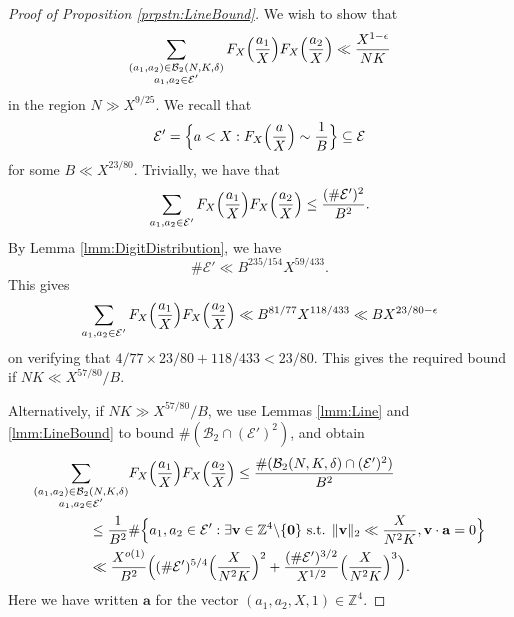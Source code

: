\documentclass[10pt]{amsart}
\theoremstyle{plain}
\numberwithin{sblmm}{thrm}
\numberwithin{equation}{section}
\begin{document}
\begin{proof}[Proof of Proposition \ref{prpstn:LineBound}] We wish to show that
\[
\sum_{\substack{ (a_1,a_2)\in\mathcal{B}_2(N,K,\delta) \\ a_1,a_2\in\mathcal{E}' }}F_X\Bigl(\frac{a_1}{X}\Bigr)F_X\Bigl(\frac{a_2}{X}\Bigr)\ll \frac{X^{1-\epsilon}}{N K}
\]
in the region $N\gg X^{9/25}$.
%
We recall that
\[
\mathcal{E}'=\Bigl\{a<X:F_X\Bigl(\frac{a}{X}\Bigr)\sim \frac{1}{B}\Bigr\}\subseteq\mathcal{E}
\]
for some $B\ll X^{23/80}$. Trivially, we have that
\[
\sum_{a_1,a_2\in\mathcal{E}'}F_X\Bigl(\frac{a_1}{X}\Bigr)F_X\Bigl(\frac{a_2}{X}\Bigr)\le \frac{(\#\mathcal{E}')^2}{B^2}.
\]
 By Lemma \ref{lmm:DigitDistribution}, we have
\begin{equation}
\#\mathcal{E}'\ll B^{235/154}X^{59/433}.\label{eq:BSetBound}
\end{equation}
 This gives 
 \[
\sum_{a_1,a_2\in\mathcal{E}'}F_X\Bigl(\frac{a_1}{X}\Bigr)F_X\Bigl(\frac{a_2}{X}\Bigr)\ll B^{81/77}X^{118/433}\ll B X^{23/80-\epsilon}
\]
on verifying that $4/77\times 23/80+118/433<23/80$. This gives the required bound if $N K\ll X^{57/80}/B$.

Alternatively, if $N K\gg X^{57/80}/B$, we use Lemmas \ref{lmm:Line} and \ref{lmm:LineBound} to bound $\#(\mathcal{B}_2\cap(\mathcal{E}')^2)$, and obtain
%
\begin{align}
\sum_{\substack{(a_1,a_2)\in\mathcal{B}_2(N,K,\delta)\\ a_1,a_2\in \mathcal{E}'}}&F_X\Bigl(\frac{a_1}{X}\Bigr)F_X\Bigl(\frac{a_2}{X}\Bigr)\le \frac{\#(\mathcal{B}_2(N,K,\delta)\cap(\mathcal{E}')^2)}{B^2}\nonumber\\
&\hspace{-1cm}\le\frac{1}{B^{2}}\#\Bigl\{a_1,a_2\in\mathcal{E}':\exists \mathbf{v}\in\mathbb{Z}^4\backslash\{\mathbf{0}\}\text{ s.t. }\|\mathbf{v}\|_2\ll \frac{X}{N^2K},\mathbf{v}\cdot\mathbf{a}=0\Bigr\}\nonumber\\
&\hspace{-1cm}\ll \frac{X^{o(1)}}{B^{2}}\Bigl((\#\mathcal{E}')^{5/4}\Bigl(\frac{X}{N^2K}\Bigr)^2+\frac{(\#\mathcal{E}')^{3/2}}{X^{1/2}}\Bigl(\frac{X}{N^2K}\Bigr)^{3}\Bigr).\label{eq:B2Bound2}
\end{align}
%
Here we have written $\mathbf{a}$ for the vector $(a_1,a_2,X,1)\in\mathbb{Z}^4$. 


\end{proof}
\end{document}

